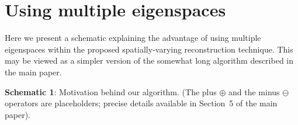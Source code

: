 \documentclass{article}
\begin{document}
\section{Using multiple eigenspaces}

Here we present a schematic explaining the advantage of using multiple
eigenspaces within the proposed spatially-varying reconstruction
technique. This may be viewed as a simpler version of the somewhat
long algorithm described in the main paper.


\noindent \begin{boxedminipage}{\textwidth} 
{\bf Schematic 1}: Motivation behind our algorithm. (The plus $\oplus$ and the
minus $\ominus$ operators are placeholders; precise details available
in Section~5 of the main paper). 


\end{boxedminipage}
\end{document}
